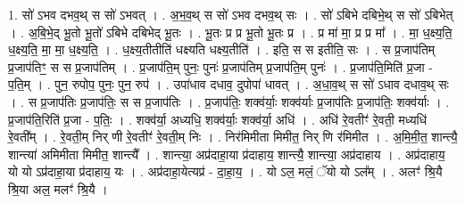 \documentclass[17pt]{extarticle}
\begin{document}
1. सो॑ ऽभव दभव॒थ् स सो॑ ऽभवत् । . अ॒भ॒व॒थ् स सो॑ ऽभव दभव॒थ् सः । . सो॑ ऽबिभे दबिभे॒थ् स सो॑ ऽबिभेत् । . अ॒बि॒भे॒द् भू॒तो भू॒तो॑ ऽबिभे दबिभेद् भू॒तः । . भू॒तः प्र प्र भू॒तो भू॒तः प्र । . प्र मा॑ मा॒ प्र प्र मा᳚ । . मा॒ ध॒क्ष्य॒ति॒ ध॒क्ष्य॒ति॒ मा॒ मा॒ ध॒क्ष्य॒ति॒ । . ध॒क्ष्य॒तीतीति॑ धक्ष्यति धक्ष्य॒तीति॑ । . इति॒ स स इतीति॒ सः । . स प्र॒जाप॑तिम् प्र॒जाप॑तिꣳ॒॒ स स प्र॒जाप॑तिम् । . प्र॒जाप॑ति॒म् पुनः॒ पुनः॑ प्र॒जाप॑तिम् प्र॒जाप॑ति॒म् पुनः॑ । . प्र॒जाप॑ति॒मिति॑ प्र॒जा - प॒ति॒म् । . पुन॒ रुपोप॒ पुनः॒ पुन॒ रुप॑ । . उपा॑धाव दधाव॒ दुपोपा॑ धावत् । . अ॒धा॒व॒थ् स सो॑ ऽधाव दधाव॒थ् सः । . स प्र॒जाप॑तिः प्र॒जाप॑तिः॒ स स प्र॒जाप॑तिः । . प्र॒जाप॑तिः॒ शक्व॑र्याः॒ शक्व॑र्याः प्र॒जाप॑तिः प्र॒जाप॑तिः॒ शक्व॑र्याः । . प्र॒जाप॑ति॒रिति॑ प्र॒जा - प॒तिः॒ । . शक्व॑र्या॒ अध्यधि॒ शक्व॑र्याः॒ शक्व॑र्या॒ अधि॑ । . अधि॑ रे॒वतीꣳ॑ रे॒वती॒ मध्यधि॑ रे॒वती᳚म् । . रे॒वती॒म् निर् णी रे॒वतीꣳ॑ रे॒वती॒म् निः । . निर॑मिमीता मिमीत॒ निर् णि र॑मिमीत । . अ॒मि॒मी॒त॒ शान्त्यै॒ शान्त्या॑ अमिमीता मिमीत॒ शान्त्यै᳚ । . शान्त्या॒ अप्र॑दाहा॒या प्र॑दाहाय॒ शान्त्यै॒ शान्त्या॒ अप्र॑दाहाय । . अप्र॑दाहाय॒ यो यो ऽप्र॑दाहा॒या प्र॑दाहाय॒ यः । . अप्र॑दाहा॒येत्यप्र॑ - दा॒हा॒य॒ । . यो ऽल॒ मलं॒ ॅयो यो ऽल᳚म् । . अलꣳ॑ श्रि॒यै श्रि॒या अल॒ मलꣳ॑ श्रि॒यै । \newline
\end{document}
